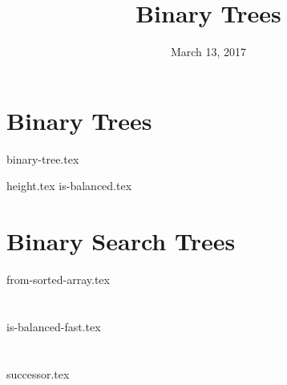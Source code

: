 \documentclass{exam}
\title{Binary Trees}
\date{March 13, 2017}
\begin{document}
\maketitle

\section{Binary Trees}
{binary-tree.tex}
\begin{questions}
{height.tex}
{is-balanced.tex}
\end{questions}

\clearpage

\section{Binary Search Trees}
\begin{questions}
{from-sorted-array.tex}
\end{questions}

\clearpage

\section{}
\begin{questions}
{is-balanced-fast.tex}
\end{questions}

\clearpage

\section{}
\begin{questions}
{successor.tex}
\end{questions}
\end{document}

